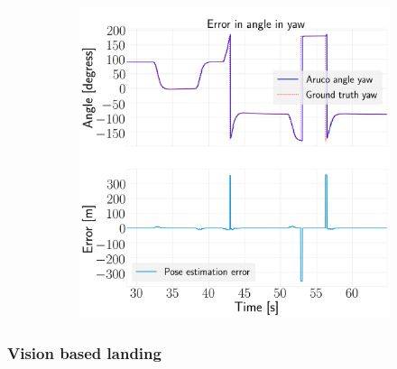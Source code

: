\documentclass[../Head/report.tex]{subfiles}
\begin{document}
\begin{figure}[H]
\begin{subfigure}[t]{.30\textwidth}
        \caption{}
        \label{fig:vision_navigation_error_pitch}
    \end{subfigure}
     \hspace{0.2em}
    \begin{subfigure}[t]{.30\textwidth}
        \centering
        \includegraphics[width=\textwidth]{../Figures/vision_navigation/test1_full_pattern_board/error_yaw/pose_error_yaw_test1.png}
        \caption{}
        \label{fig:vision_navigation_error_yaw}
    \end{subfigure}
    \caption{}
    \label{fig:vision_navigation_error_angle}
\end{figure}

\subsubsection{Vision based landing}
\label{sec:vision_based_landing}
\end{document}
